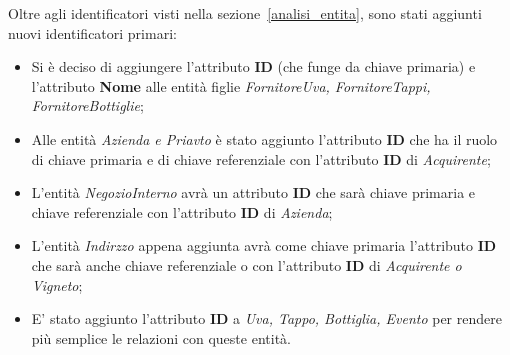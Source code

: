 Oltre agli identificatori visti nella sezione~\ref{analisi_entita}, sono stati aggiunti nuovi identificatori primari:

\begin{itemize}
	\item Si è deciso di aggiungere l'attributo \textbf{ID} (che funge da chiave primaria) e l'attributo \textbf{Nome} alle entità figlie \emph{FornitoreUva, FornitoreTappi, FornitoreBottiglie};
	\item Alle entità \emph{Azienda e Priavto} è stato aggiunto l'attributo \textbf{ID} che ha il ruolo di chiave primaria e di chiave referenziale con l'attributo \textbf{ID} di \emph{Acquirente};
	\item L'entità \emph{NegozioInterno} avrà un attributo \textbf{ID} che sarà chiave primaria e chiave referenziale con l'attributo \textbf{ID} di \emph{Azienda};
	\item L'entità \emph{Indirzzo} appena aggiunta avrà come chiave primaria l'attributo \textbf{ID} che sarà anche chiave referenziale o con l'attributo \textbf{ID} di \emph{Acquirente o Vigneto};
	\item E' stato aggiunto l'attributo \textbf{ID} a \emph{Uva, Tappo, Bottiglia, Evento} per rendere più semplice le relazioni con queste entità.
\end{itemize}